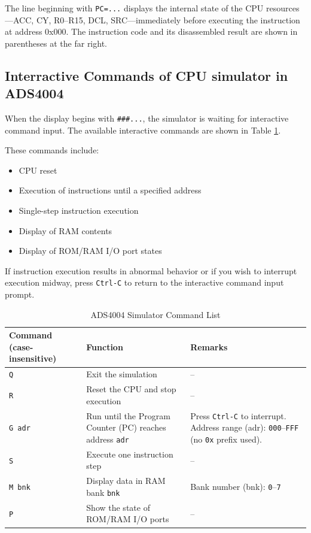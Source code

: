 The line beginning with \texttt{PC=...} displays the internal state of the CPU resources—ACC, CY, R0–R15, DCL, SRC—immediately before executing the instruction at address 0x000.  
The instruction code and its disassembled result are shown in parentheses at the far right.


\subsection{Interractive Commands of CPU simulator in ADS4004}
When the display begins with \texttt{\#\#\#...}, the simulator is waiting for interactive command input.  
The available interactive commands are shown in Table \ref{tb:ADS4004SIMULATORCOMMAND}.

These commands include:
\begin{itemize}
  \item CPU reset
  \item Execution of instructions until a specified address
  \item Single-step instruction execution
  \item Display of RAM contents
  \item Display of ROM/RAM I/O port states
\end{itemize}

If instruction execution results in abnormal behavior or if you wish to interrupt execution midway,  
press \texttt{Ctrl-C} to return to the interactive command input prompt.

\begin{table}
\centering
\begin{tabular}{|p{2.5cm}|p{5cm}|p{6cm}|}
\hline
\rowcolor{LightPurple}
\textbf{Command (case-insensitive)} & \textbf{Function} & \textbf{Remarks} \\
\hline
\texttt{Q} & Exit the simulation & -- \\
\hline
\texttt{R} & Reset the CPU and stop execution & -- \\
\hline
\texttt{G adr} & Run until the Program Counter (PC) reaches address \texttt{adr} & Press \texttt{Ctrl-C} to interrupt.  
Address range (adr): \texttt{000}–\texttt{FFF} (no \texttt{0x} prefix used). \\
\hline
\texttt{S} & Execute one instruction step & -- \\
\hline
\texttt{M bnk} & Display data in RAM bank \texttt{bnk} & Bank number (bnk): \texttt{0}–\texttt{7} \\
\hline
\texttt{P} & Show the state of ROM/RAM I/O ports & -- \\
\hline
\end{tabular}
\caption{ADS4004 Simulator Command List}
\label{tb:ADS4004SIMULATORCOMMAND}
\end{table}

